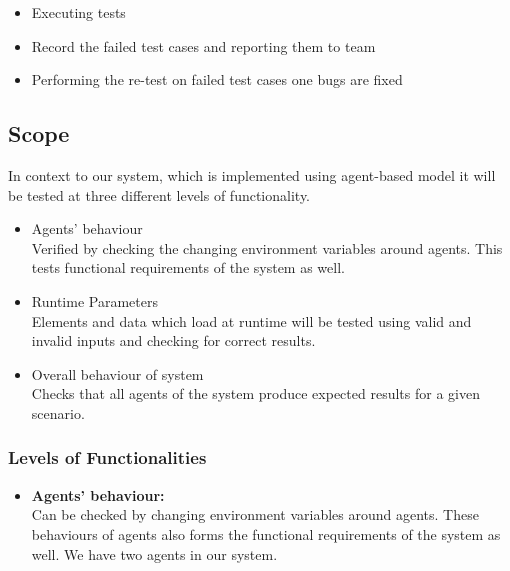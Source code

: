 \documentclass[11pt]{article}
\begin{document}
\begin{enumerate}
\begin{itemize}
\item Executing tests

\item Record the failed test cases and reporting them to team

\item Performing the re-test on failed test cases one bugs are fixed
\end{itemize}

\subsection{Scope}
In context to our system, which is implemented using agent-based model it will be tested at three different levels of functionality.
\begin{itemize}
\item Agents' behaviour\hfill \\
Verified by checking the changing environment variables around agents. This tests functional requirements of the system as well.\hfill \\

\item Runtime Parameters\hfill \\
Elements and data which load at runtime will be tested using valid and invalid inputs and checking for correct results. \hfill \\

\item Overall behaviour of system\hfill \\
Checks that all agents of the system produce expected results for a given scenario.\hfill \\

\end{itemize} 



\subsubsection{Levels of Functionalities}
\begin{itemize}%
\item \textbf{Agents' behaviour: } \hspace \\ %
Can be checked by changing environment variables around agents. These behaviours of agents also forms the functional requirements of the system as well. We have two agents in our system. 


\end{itemize}
\end{enumerate}
\end{document}
